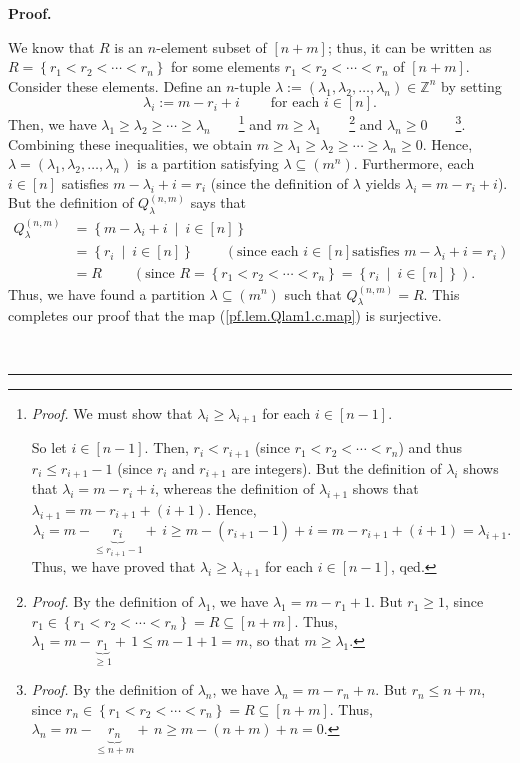 \documentclass[numbers=enddot,12pt,final,onecolumn,notitlepage]{scrartcl}%
\theoremstyle{definition}
\newenvironment{proof}[1][Proof]{\noindent\textbf{#1.} }{\ \rule{0.5em}{0.5em}}
\begin{document}
\begin{enumerate}
\begin{proof}
\begin{itemize}
We know that $R$ is an $n$-element subset of $\left[  n+m\right]  $; thus, it
can be written as $R=\left\{  r_{1}<r_{2}<\cdots<r_{n}\right\}  $ for some
elements $r_{1}<r_{2}<\cdots<r_{n}$ of $\left[  n+m\right]  $. Consider these
elements. Define an $n$-tuple $\lambda:=\left(  \lambda_{1},\lambda_{2}%
,\ldots,\lambda_{n}\right)  \in\mathbb{Z}^{n}$ by setting
\[
\lambda_{i}:=m-r_{i}+i\ \ \ \ \ \ \ \ \ \ \text{for each }i\in\left[
n\right]  .
\]
Then, we have $\lambda_{1}\geq\lambda_{2}\geq\cdots\geq\lambda_{n}%
$\ \ \ \ \footnote{\textit{Proof.} We must show that $\lambda_{i}\geq
\lambda_{i+1}$ for each $i\in\left[  n-1\right]  $.
\par
So let $i\in\left[  n-1\right]  $. Then, $r_{i}<r_{i+1}$ (since $r_{1}%
<r_{2}<\cdots<r_{n}$) and thus $r_{i}\leq r_{i+1}-1$ (since $r_{i}$ and
$r_{i+1}$ are integers). But the definition of $\lambda_{i}$ shows that
$\lambda_{i}=m-r_{i}+i$, whereas the definition of $\lambda_{i+1}$ shows that
$\lambda_{i+1}=m-r_{i+1}+\left(  i+1\right)  $. Hence,%
\[
\lambda_{i}=m-\underbrace{r_{i}}_{\leq r_{i+1}-1}+\,i\geq m-\left(
r_{i+1}-1\right)  +i=m-r_{i+1}+\left(  i+1\right)  =\lambda_{i+1}.
\]
Thus, we have proved that $\lambda_{i}\geq\lambda_{i+1}$ for each $i\in\left[
n-1\right]  $, qed.} and $m\geq\lambda_{1}$\ \ \ \ \footnote{\textit{Proof.}
By the definition of $\lambda_{1}$, we have $\lambda_{1}=m-r_{1}+1$. But
$r_{1}\geq1$, since $r_{1}\in\left\{  r_{1}<r_{2}<\cdots<r_{n}\right\}
=R\subseteq\left[  n+m\right]  $. Thus, $\lambda_{1}=m-\underbrace{r_{1}%
}_{\geq1}+\,1\leq m-1+1=m$, so that $m\geq\lambda_{1}$.} and $\lambda_{n}%
\geq0$\ \ \ \ \footnote{\textit{Proof.} By the definition of $\lambda_{n}$, we
have $\lambda_{n}=m-r_{n}+n$. But $r_{n}\leq n+m$, since $r_{n}\in\left\{
r_{1}<r_{2}<\cdots<r_{n}\right\}  =R\subseteq\left[  n+m\right]  $. Thus,
$\lambda_{n}=m-\underbrace{r_{n}}_{\leq n+m}+\,n\geq m-\left(  n+m\right)
+n=0$.}. Combining these inequalities, we obtain $m\geq\lambda_{1}\geq
\lambda_{2}\geq\cdots\geq\lambda_{n}\geq0$. Hence, $\lambda=\left(
\lambda_{1},\lambda_{2},\ldots,\lambda_{n}\right)  $ is a partition satisfying
$\lambda\subseteq\left(  m^{n}\right)  $. Furthermore, each $i\in\left[
n\right]  $ satisfies $m-\lambda_{i}+i=r_{i}$ (since the definition of
$\lambda$ yields $\lambda_{i}=m-r_{i}+i$). But the definition of $Q_{\lambda
}^{\left(  n,m\right)  }$ says that
\begin{align*}
Q_{\lambda}^{\left(  n,m\right)  }  &  =\left\{  m-\lambda_{i}+i\ \mid
\ i\in\left[  n\right]  \right\} \\
&  =\left\{  r_{i}\ \mid\ i\in\left[  n\right]  \right\}
\ \ \ \ \ \ \ \ \ \ \left(  \text{since each }i\in\left[  n\right]  \text{
satisfies }m-\lambda_{i}+i=r_{i}\right) \\
&  =R\ \ \ \ \ \ \ \ \ \ \left(  \text{since }R=\left\{  r_{1}<r_{2}%
<\cdots<r_{n}\right\}  =\left\{  r_{i}\ \mid\ i\in\left[  n\right]  \right\}
\right)  .
\end{align*}
Thus, we have found a partition $\lambda\subseteq\left(  m^{n}\right)  $ such
that $Q_{\lambda}^{\left(  n,m\right)  }=R$. This completes our proof that the
map (\ref{pf.lem.Qlam1.c.map}) is surjective.
\end{itemize}


\end{proof}
\end{enumerate}
\end{document}
